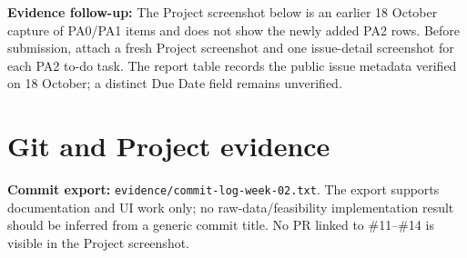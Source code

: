 \textbf{Evidence follow-up:} The Project screenshot below is an earlier 18 October capture of PA0/PA1 items and does not show the newly added PA2 rows. Before submission, attach a fresh Project screenshot and one issue-detail screenshot for each PA2 to-do task. The report table records the public issue metadata verified on 18 October; a distinct Due Date field remains unverified.

\section{Git and Project evidence}
\textbf{Commit export:} \texttt{evidence/commit-log-week-02.txt}. The export supports documentation and UI work only; no raw-data/feasibility implementation result should be inferred from a generic commit title. No PR linked to \#11--\#14 is visible in the Project screenshot.

